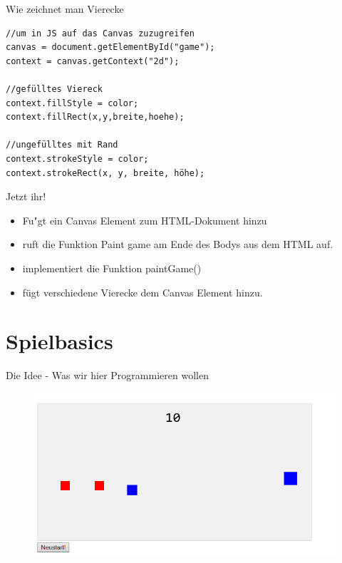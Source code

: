 \documentclass[18pt]{beamer}
\begin{document}
\begin{frame}[fragile]{Wie zeichnet man Vierecke}
\begin{lstlisting}
//um in JS auf das Canvas zuzugreifen
canvas = document.getElementById("game");
context = canvas.getContext("2d");

//gefülltes Viereck
context.fillStyle = color;
context.fillRect(x,y,breite,hoehe);

//ungefülltes mit Rand
context.strokeStyle = color;
context.strokeRect(x, y, breite, höhe);
\end{lstlisting}

\end{frame}

\begin{frame}{Jetzt ihr!}
\begin{itemize}
	\item Fu"gt ein Canvas Element zum HTML-Dokument hinzu
	\item ruft die Funktion Paint game am Ende des Bodys aus dem HTML auf. 
	\item implementiert die Funktion paintGame() 
	\item fügt verschiedene Vierecke dem Canvas Element hinzu. 
\end{itemize}
\end{frame}

\section{Spielbasics}

\begin{frame}{Die Idee - Was wir hier Programmieren wollen}
\begin{figure}[htb]
	\centering
	\includegraphics[width=1\textwidth]{logos/game}
\end{figure}
\end{frame}
\end{document}
